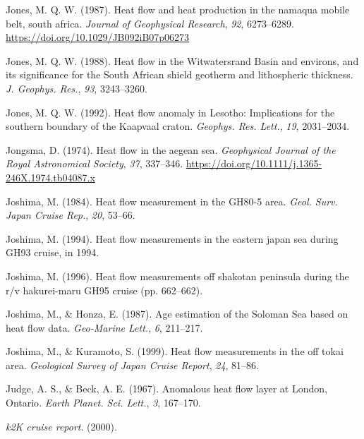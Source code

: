 \begin{CSLReferences}{1}{1}
\leavevmode{}%
Jones, M. Q. W. (1987). Heat flow and heat production in the namaqua mobile belt, south africa. \emph{Journal of Geophysical Research}, \emph{92}, 6273--6289. \url{https://doi.org/10.1029/JB092iB07p06273}

\leavevmode{}%
Jones, M. Q. W. (1988). Heat flow in the {Witwatersrand Basin} and environs, and its significance for the {South African} shield geotherm and lithospheric thickness. \emph{J. Geophys. Res.}, \emph{93}, 3243--3260.

\leavevmode{}%
Jones, M. Q. W. (1992). Heat flow anomaly in {Lesotho}: Implications for the southern boundary of the {Kaapvaal} craton. \emph{Geophys. Res. Lett.}, \emph{19}, 2031--2034.

\leavevmode{}%
Jongsma, D. (1974). Heat flow in the aegean sea. \emph{Geophysical Journal of the Royal Astronomical Society}, \emph{37}, 337--346. \url{https://doi.org/10.1111/j.1365-246X.1974.tb04087.x}

\leavevmode{}%
Joshima, M. (1984). Heat flow measurement in the GH80-5 area. \emph{Geol. Surv. Japan Cruise Rep.}, \emph{20}, 53--66.

\leavevmode{}%
Joshima, M. (1994). Heat flow measurements in the eastern japan sea during GH93 cruise, in 1994.

\leavevmode{}%
Joshima, M. (1996). Heat flow measurements off shakotan peninsula during the r/v hakurei-maru GH95 cruise (pp. 662--662).

\leavevmode{}%
Joshima, M., \& Honza, E. (1987). Age estimation of the {Soloman Sea} based on heat flow data. \emph{Geo-Marine Lett.}, \emph{6}, 211--217.

\leavevmode{}%
Joshima, M., \& Kuramoto, S. (1999). Heat flow measurements in the off tokai area. \emph{Geological Survey of Japan Cruise Report}, \emph{24}, 81--86.

\leavevmode{}%
Judge, A. S., \& Beck, A. E. (1967). Anomalous heat flow layer at {London, Ontario}. \emph{Earth Planet. Sci. Lett.}, \emph{3}, 167--170.

\leavevmode{}%
\emph{k2K cruise report}. (2000).


\end{CSLReferences}
